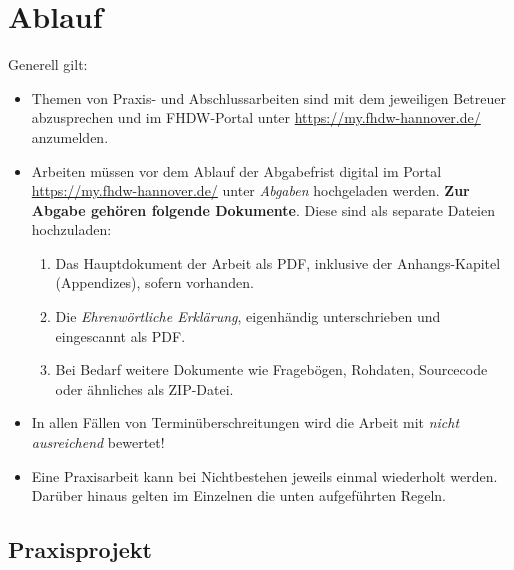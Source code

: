 \chapter{Ablauf}

Generell gilt:
\begin{itemize}
    \item Themen von Praxis- und Abschlussarbeiten sind mit dem jeweiligen Betreuer abzusprechen und im FHDW-Portal unter \url{https://my.fhdw-hannover.de/} anzumelden.
    \item Arbeiten müssen vor dem Ablauf der Abgabefrist digital im Portal \url{https://my.fhdw-hannover.de/} unter \textit{Abgaben} hochgeladen werden. \textbf{Zur Abgabe gehören folgende Dokumente}. Diese sind als separate Dateien hochzuladen:
    \begin{enumerate}
        \item Das Hauptdokument der Arbeit als PDF, inklusive der Anhangs-Kapitel (Appendizes), sofern vorhanden.
        \item Die \textit{Ehrenwörtliche Erklärung}, eigenhändig  unterschrieben und eingescannt als PDF.
        \item Bei Bedarf weitere Dokumente wie Fragebögen, Rohdaten, Source\-code oder ähnliches als ZIP-Datei.
    \end{enumerate}
    \item In allen Fällen von Terminüberschreitungen wird die Arbeit mit \textit{nicht ausreichend} bewertet!
    \item Eine Praxisarbeit kann bei Nichtbestehen jeweils einmal wiederholt werden. Darüber hinaus gelten im Einzelnen die unten aufgeführten Regeln.
\end{itemize}

\section{Praxisprojekt}
\label{sec:praxisprojekt}

